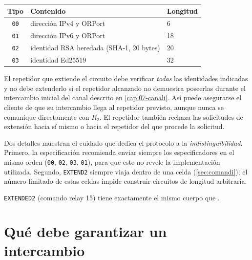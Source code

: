 \begin{center}
\begin{tabular}{cll}
\toprule
Tipo & Contenido & Longitud \\
\midrule
\texttt{00} & dirección IPv4 y ORPort & 6 \\
\texttt{01} & dirección IPv6 y ORPort & 18 \\
\texttt{02} & identidad RSA heredada (SHA-1, 20 bytes) & 20 \\
\texttt{03} & identidad Ed25519 & 32 \\
\bottomrule
\end{tabular}
\end{center}

El repetidor que extiende el circuito debe verificar \emph{todas} las identidades indicadas y no debe extenderlo si el repetidor alcanzado no demuestra poseerlas durante el intercambio inicial del canal descrito en \cref{cap:07-canali}. Así puede asegurarse el cliente de que su intercambio llega al repetidor previsto, aunque nunca se comunique directamente con $R_2$. El repetidor también rechaza las solicitudes de extensión hacia sí mismo o hacia el repetidor del que procede la solicitud.

Dos detalles muestran el cuidado que dedica el protocolo a la \emph{indistinguibilidad}. Primero, la especificación recomienda enviar siempre los especificadores en el mismo orden (\texttt{00}, \texttt{02}, \texttt{03}, \texttt{01}), para que este no revele la implementación utilizada. Segundo, \texttt{EXTEND2} siempre viaja dentro de una celda  (\cref{sec:comandi}); el número limitado de estas celdas impide construir circuitos de longitud arbitraria.

\texttt{EXTENDED2} (comando relay 15) tiene exactamente el mismo cuerpo que .

\section{Qué debe garantizar un intercambio}\label{sec:circ-requisiti}


